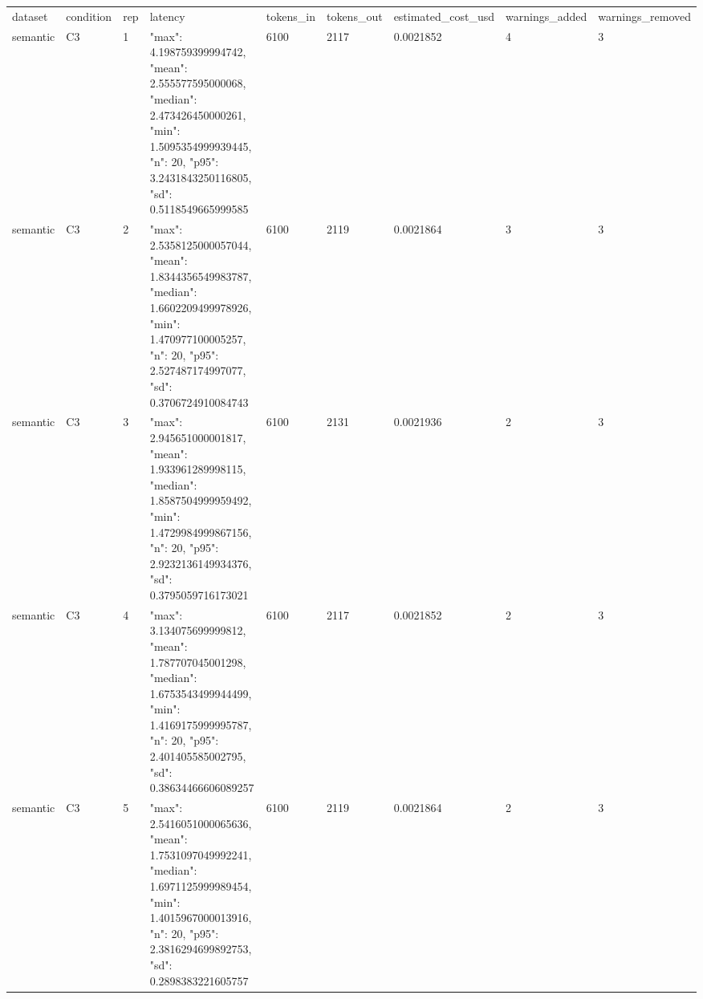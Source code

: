 \begin{tabular}{lllllllll}
dataset & condition & rep & latency & tokens\_in & tokens\_out & estimated\_cost\_usd & warnings\_added & warnings\_removed \\
semantic & C3 & 1 & {"max": 4.198759399994742, "mean": 2.555577595000068, "median": 2.473426450000261, "min": 1.5095354999939445, "n": 20, "p95": 3.2431843250116805, "sd": 0.5118549665999585} & 6100 & 2117 & 0.0021852 & 4 & 3 \\
semantic & C3 & 2 & {"max": 2.5358125000057044, "mean": 1.8344356549983787, "median": 1.6602209499978926, "min": 1.470977100005257, "n": 20, "p95": 2.527487174997077, "sd": 0.3706724910084743} & 6100 & 2119 & 0.0021864 & 3 & 3 \\
semantic & C3 & 3 & {"max": 2.945651000001817, "mean": 1.933961289998115, "median": 1.8587504999959492, "min": 1.4729984999867156, "n": 20, "p95": 2.9232136149934376, "sd": 0.3795059716173021} & 6100 & 2131 & 0.0021936 & 2 & 3 \\
semantic & C3 & 4 & {"max": 3.134075699999812, "mean": 1.787707045001298, "median": 1.6753543499944499, "min": 1.4169175999995787, "n": 20, "p95": 2.401405585002795, "sd": 0.38634466606089257} & 6100 & 2117 & 0.0021852 & 2 & 3 \\
semantic & C3 & 5 & {"max": 2.5416051000065636, "mean": 1.7531097049992241, "median": 1.6971125999989454, "min": 1.4015967000013916, "n": 20, "p95": 2.3816294699892753, "sd": 0.2898383221605757} & 6100 & 2119 & 0.0021864 & 2 & 3 \\
\end{tabular}